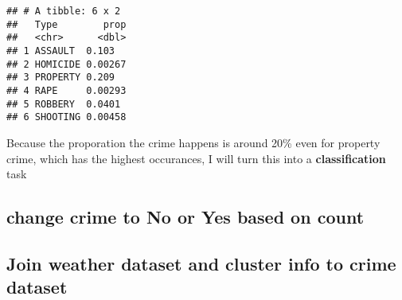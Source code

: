 \documentclass[]{article}
\newenvironment{Shaded}{\begin{snugshade}}{\end{snugshade}}
\newcommand{\KeywordTok}[1]{\textcolor[rgb]{0.13,0.29,0.53}{\textbf{#1}}}
\newcommand{\DataTypeTok}[1]{\textcolor[rgb]{0.13,0.29,0.53}{#1}}
\newcommand{\DecValTok}[1]{\textcolor[rgb]{0.00,0.00,0.81}{#1}}
\newcommand{\StringTok}[1]{\textcolor[rgb]{0.31,0.60,0.02}{#1}}
\newcommand{\OperatorTok}[1]{\textcolor[rgb]{0.81,0.36,0.00}{\textbf{#1}}}
\newcommand{\NormalTok}[1]{#1}
\begin{document}
\begin{Shaded}
\end{Shaded}

\begin{verbatim}
## # A tibble: 6 x 2
##   Type        prop
##   <chr>      <dbl>
## 1 ASSAULT  0.103  
## 2 HOMICIDE 0.00267
## 3 PROPERTY 0.209  
## 4 RAPE     0.00293
## 5 ROBBERY  0.0401 
## 6 SHOOTING 0.00458
\end{verbatim}

Because the proporation the crime happens is around 20\% even for
property crime, which has the highest occurances, I will turn this into
a \textbf{classification} task

\subsection{change crime to No or Yes based on
count}\label{change-crime-to-no-or-yes-based-on-count}

\begin{Shaded}
\end{Shaded}

\subsection{Join weather dataset and cluster info to crime
dataset}\label{join-weather-dataset-and-cluster-info-to-crime-dataset}

\begin{Shaded}
\end{Shaded}
\end{document}
